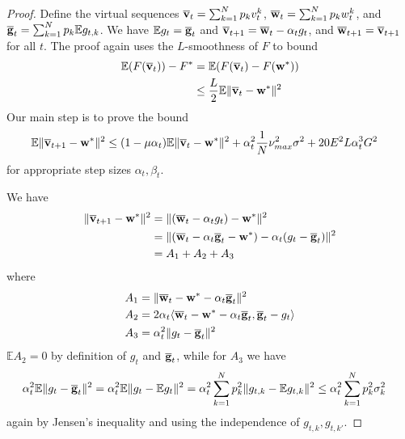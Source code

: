 \begin{proof}
Define the virtual sequences ${\overline{\mathbf{v}}}_{t}=\sum_{k=1}^{N}p_{k}v_{t}^{k}$,
${\overline{\mathbf{w}}}_{t}=\sum_{k=1}^{N}p_{k}w_{t}^{k}$, and ${\overline{\mathbf{g}}}_{t}=\sum_{k=1}^{N}p_{k}\mathbb{E}g_{t,k}$.
We have $\mathbb{E}g_{t}={\overline{\mathbf{g}}}_{t}$ and ${\overline{\mathbf{v}}}_{t+1}={\overline{\mathbf{w}}}_{t}-\alpha_{t}g_{t}$,
and ${\overline{\mathbf{w}}}_{t+1}={\overline{\mathbf{v}}}_{t+1}$ for all $t$. The proof
again uses the $L$-smoothness of $F$ to bound 
\begin{align*}
\mathbb{E}(F({\overline{\mathbf{v}}}_{t}))-F^{\ast} & =\mathbb{E}(F({\overline{\mathbf{v}}}_{t})-F({\mathbf{w}}^{\ast}))\\
& \leq\frac{L}{2}\mathbb{E}\|{\overline{\mathbf{v}}}_{t}-{\mathbf{w}}^{\ast}\|^{2}
\end{align*}
Our main step is to prove the bound
\begin{align*}
\mathbb{E}\|{\overline{\mathbf{v}}}_{t+1}-{\mathbf{w}}^{\ast}\|^{2} & \leq(1-\mu\alpha_{t})\mathbb{E}\|{\overline{\mathbf{v}}}_{t}-{\mathbf{w}}^{\ast}\|^{2}+\alpha_{t}^{2}\frac{1}{N}\nu_{max}^{2}\sigma^{2}+20E^{2}L\alpha_{t}^{3}G^{2}
\end{align*}
 for appropriate step sizes $\alpha_{t},\beta_{t}$.

We have 
\begin{align*}
\|{\overline{\mathbf{v}}}_{t+1}-{\mathbf{w}}^{\ast}\|^{2} & =\|({\overline{\mathbf{w}}}_{t}-\alpha_{t}g_{t})-{\mathbf{w}}^{\ast}\|^{2}\\
& =\|({\overline{\mathbf{w}}}_{t}-\alpha_{t}{\overline{\mathbf{g}}}_{t}-{\mathbf{w}}^{\ast})-\alpha_{t}(g_{t}-{\overline{\mathbf{g}}}_{t})\|^{2}\\
& =A_{1}+A_{2}+A_{3}
\end{align*}
where 
\begin{align*}
A_{1} & =\|{\overline{\mathbf{w}}}_{t}-{\mathbf{w}}^{\ast}-\alpha_{t}{\overline{\mathbf{g}}}_{t}\|^{2}\\
A_{2} & =2\alpha_{t}\langle{\overline{\mathbf{w}}}_{t}-{\mathbf{w}}^{\ast}-\alpha_{t}{\overline{\mathbf{g}}}_{t},{\overline{\mathbf{g}}}_{t}-g_{t}\rangle\\
A_{3} & =\alpha_{t}^{2}\|g_{t}-{\overline{\mathbf{g}}}_{t}\|^{2}
\end{align*}
$\mathbb{E}A_{2}=0$ by definition of $g_{t}$ and ${\overline{\mathbf{g}}}_{t}$,
while for $A_{3}$ we have
\begin{align*}
\alpha_{t}^{2}\mathbb{E}\|g_{t}-{\overline{\mathbf{g}}}_{t}\|^{2} & =\alpha_{t}^{2}\mathbb{E}\|g_{t}-\mathbb{E}g_{t}\|^{2}=\alpha_{t}^{2}\sum_{k=1}^{N}p_{k}^{2}\|g_{t,k}-\mathbb{E}g_{t,k}\|^{2}\leq\alpha_{t}^{2}\sum_{k=1}^{N}p_{k}^{2}\sigma_{k}^{2}
\end{align*}
again by Jensen's inequality and using the independence of $g_{t,k},g_{t,k'}$. 


\end{proof}
